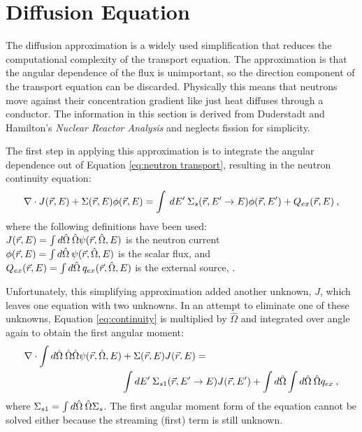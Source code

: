 
\chapter{Diffusion Equation}
\label{sec:AppendixA}
The diffusion approximation is a widely used simplification that reduces the computational complexity of the transport equation. The approximation is that the angular dependence of the flux is unimportant, so the direction component of the transport equation can be discarded. Physically this means that neutrons move against their concentration gradient like just heat diffuses through a conductor. The information in this section is derived from Duderstadt and Hamilton's \emph{Nuclear Reactor Analysis} \cite{Duderstadt1976} and neglects fission for simplicity. 

The first step in applying this approximation is to integrate the angular dependence out of Equation \eqref{eq:neutron transport}, resulting in the neutron continuity equation:
%
\begin{equation}
  \nabla \cdot J(\vec{r},E) + \Sigma(\vec{r},E)\phi(\vec{r},E) = \int \:dE' \:\Sigma_{s}(\vec{r}, E' \to E)\phi(\vec{r},E') + Q_{ex}(\vec{r},E) \:,
  \label{eq:continuity} 
\end{equation}
%
where the following definitions have been used:\\
\indent $J(\vec{r},E) = \int d\hat{\Omega} \:\hat{\Omega} \psi(\vec{r}, \hat{\Omega}, E)$ is the neutron current \\
\indent  $\phi(\vec{r},E) = \int d\hat{\Omega} \:\psi(\vec{r}, \hat{\Omega}, E)$ is the scalar flux, and \\
\indent $Q_{ex} (\vec{r},E)= \int d\hat{\Omega} \:q_{ex}(\vec{r}, \hat{\Omega}, E)$ is the external source, \cite{Duderstadt1976}.

Unfortunately, this simplifying approximation added another unknown, $J$, which leaves one equation with two unknowns. In an attempt to eliminate one of these unknowns, Equation \eqref{eq:continuity} is multiplied by $\hat{\Omega}$ and integrated over angle again to obtain the first angular moment:
%
\begin{align}
  \nabla \cdot \int  d\hat{\Omega} \:\hat{\Omega} \hat{\Omega} \psi(\vec{r}, \hat{\Omega}, E) &+ \Sigma(\vec{r},E) J(\vec{r},E)= \nonumber \\
  &\int dE' \:\Sigma_{s1}(\vec{r}, E' \to E)J(\vec{r},E') + \int d\hat{\Omega} \int d\hat{\Omega} \:\hat{\Omega} q_{ex} \:,
  \label{eq:current1}
\end{align}
%
where $\Sigma_{s1}  = \int d\hat{\Omega} \:\hat{\Omega} \Sigma_{s}$. The first angular moment form of the equation cannot be solved either because the streaming (first) term is still unknown. 

